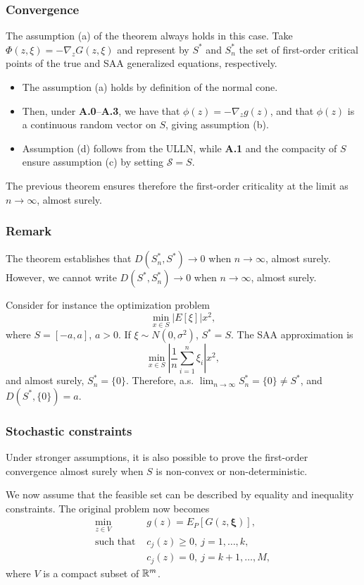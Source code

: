 \documentclass{beamer}
\begin{document}
\begin{frame}
\frametitle{Convergence}

The assumption (a) of the theorem always holds in this case.
Take $\Phi(z,\xi) = -\nabla_z G(z, \xi)$ and represent by $S^*$ and $S^*_n$ the set of first-order critical points of the true and SAA generalized equations, respectively.

\begin{itemize}
\item
The assumption (a) holds by definition of the normal cone.
\item
Then, under \textbf{A.0}--\textbf{A.3}, we have that $\phi(z) = -\nabla_z
g(z)$, and that $\phi(z)$ is a continuous random vector on $S$, giving assumption (b).
\item
Assumption (d) follows from the ULLN, while \textbf{A.1} and the compacity of $S$ ensure assumption (c) by setting $\mathcal{S} = S$. 
\end{itemize}

The previous theorem ensures therefore the first-order criticality at the limit as $n\rightarrow\infty$, almost surely.

\end{frame}

\begin{frame}
\frametitle{Remark}

The theorem establishes that $D(S_n^*, S^*) \rightarrow 0$ when $n \rightarrow \infty$, almost surely. However, we cannot write $D(S^*, S_n^*) \rightarrow 0$ when $n \rightarrow \infty$, almost surely.

\mbox{}

Consider for instance the optimization problem
$$
\min_{x \in S} |E[\xi]| x^2,
$$
where $S = [-a,a]$, $a > 0$. If $\xi \sim N(0, \sigma^2)$, $S^* = S$.
The SAA approximation is
$$
\min_{x \in S} \left|\frac{1}{n} \sum_{i=1}^n \xi_i\right| x^2,
$$
and almost surely, $S^*_n = \{ 0 \}$. Therefore, a.s. $\lim_{n \rightarrow \infty} S^*_n = \{ 0 \} \ne S^*$, and $D(S^*, \{0\}) = a$.

\end{frame}

\begin{frame}
\frametitle{Stochastic constraints}

Under stronger assumptions, it is also possible to prove the first-order convergence almost surely when $S$ is non-convex or non-deterministic.

\mbox{}

We now assume that the feasible set can be described by equality and inequality constraints.
The original problem now becomes
\begin{align*}
\min_{z \in V}\ & g(z) = E_P[G(z, \boldsymbol{\xi})],\\
\text{such that } & c_j(z) \geq 0,\ j = 1,\ldots,k,\\
& c_j(z) = 0,\ j = k+1,\ldots, M,
\end{align*}
where $V$ is a compact subset of $\mathbb{R}^m$.

\end{frame}
\end{document}
